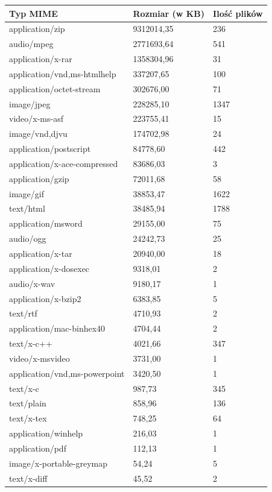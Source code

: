 \begin{table}[p]
    \centering
    \begin{tabular}{|l|l|l|}
        \hline
        \textbf{Typ MIME} & \textbf{Rozmiar (w KB)} & \textbf{Ilość plików}\\
        \hline
application/zip & 9312014,35 & 236 \\
audio/mpeg & 2771693,64 & 541 \\
application/x-rar & 1358304,96 & 31 \\
application/vnd,ms-htmlhelp & 337207,65 & 100 \\
application/octet-stream & 302676,00 & 71 \\
image/jpeg & 228285,10 & 1347 \\
video/x-ms-asf & 223755,41 & 15 \\
image/vnd,djvu & 174702,98 & 24 \\
application/postscript & 84778,60 & 442 \\
application/x-ace-compressed & 83686,03 & 3 \\
application/gzip & 72011,68 & 58 \\
image/gif & 38853,47 & 1622 \\
text/html & 38485,94 & 1788 \\
application/msword & 29155,00 & 75 \\
audio/ogg & 24242,73 & 25 \\
application/x-tar & 20940,00 & 18 \\
application/x-dosexec & 9318,01 & 2 \\
audio/x-wav & 9180,17 & 1 \\
application/x-bzip2 & 6383,85 & 5 \\
text/rtf & 4710,93 & 2 \\
application/mac-binhex40 & 4704,44 & 2 \\
text/x-c++ & 4021,66 & 347 \\
video/x-msvideo & 3731,00 & 1 \\
application/vnd,ms-powerpoint & 3420,50 & 1 \\
text/x-c & 987,73 & 345 \\
text/plain & 858,96 & 136 \\
text/x-tex & 748,25 & 64 \\
application/winhelp & 216,03 & 1 \\
application/pdf & 112,13 & 1 \\
image/x-portable-greymap & 54,24 & 5 \\
text/x-diff & 45,52 & 2 \\

\end{tabular}
\end{table}
